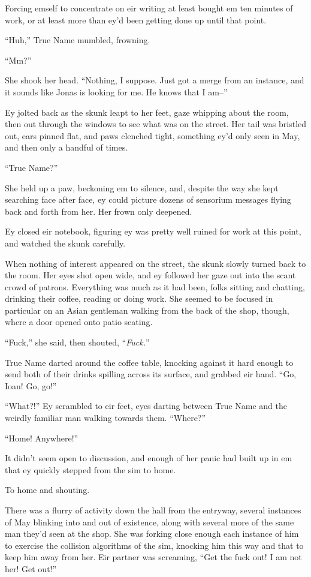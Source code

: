 Forcing emself to concentrate on eir writing at least bought em ten minutes of work, or at least more than ey'd been getting done up until that point.

``Huh,'' True Name mumbled, frowning.

``Mm?''

She shook her head. ``Nothing, I suppose. Just got a merge from an instance, and it sounds like Jonas is looking for me. He knows that I am--''

Ey jolted back as the skunk leapt to her feet, gaze whipping about the room, then out through the windows to see what was on the street. Her tail was bristled out, ears pinned flat, and paws clenched tight, something ey'd only seen in May, and then only a handful of times.

``True Name?''

She held up a paw, beckoning em to silence, and, despite the way she kept searching face after face, ey could picture dozens of sensorium messages flying back and forth from her. Her frown only deepened.

Ey closed eir notebook, figuring ey was pretty well ruined for work at this point, and watched the skunk carefully.

When nothing of interest appeared on the street, the skunk slowly turned back to the room. Her eyes shot open wide, and ey followed her gaze out into the scant crowd of patrons. Everything was much as it had been, folks sitting and chatting, drinking their coffee, reading or doing work. She seemed to be focused in particular on an Asian gentleman walking from the back of the shop, though, where a door opened onto patio seating.

``Fuck,'' she said, then shouted, ``\emph{Fuck.}''

True Name darted around the coffee table, knocking against it hard enough to send both of their drinks spilling across its surface, and grabbed eir hand. ``Go, Ioan! Go, go!''

``What?!'' Ey scrambled to eir feet, eyes darting between True Name and the weirdly familiar man walking towards them. ``Where?''

``Home! Anywhere!''

It didn't seem open to discussion, and enough of her panic had built up in em that ey quickly stepped from the sim to home.

To home and shouting.

There was a flurry of activity down the hall from the entryway, several instances of May blinking into and out of existence, along with several more of the same man they'd seen at the shop. She was forking close enough each instance of him to exercise the collision algorithms of the sim, knocking him this way and that to keep him away from her. Eir partner was screaming, ``Get the fuck out! I am not her! Get out!''

